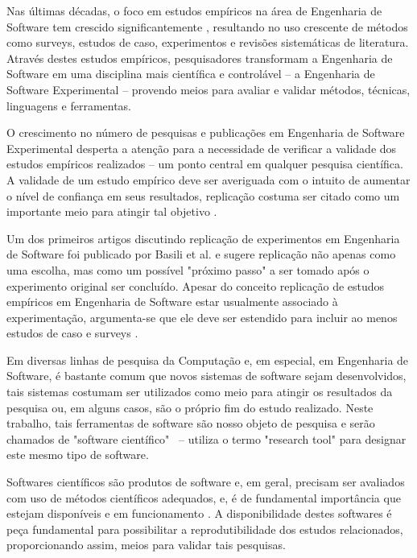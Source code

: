 \documentclass[12pt]{article}
\begin{document}
Nas últimas décadas, o foco em estudos empíricos na área de Engenharia de
Software tem crescido significantemente \cite{Stol2015}, resultando no uso
crescente de métodos como surveys, estudos de caso, experimentos e revisões
sistemáticas de literatura. Através destes estudos empíricos, pesquisadores
transformam a Engenharia de Software em uma disciplina mais científica e
controlável -- a  Engenharia de Software Experimental -- provendo meios para
avaliar e validar métodos, técnicas, linguagens e ferramentas.

O crescimento no número de pesquisas e publicações em Engenharia de Software
Experimental desperta a atenção para a necessidade de verificar a validade dos
estudos empíricos realizados -- um ponto central em qualquer pesquisa
científica. A validade de um estudo empírico deve ser averiguada com o intuito
de aumentar o nível de confiança em seus resultados, replicação costuma ser
citado como um importante meio para atingir tal objetivo \cite{Almqvist2006}.

Um dos primeiros artigos discutindo replicação de experimentos em Engenharia
de Software foi publicado por Basili et al. \cite{Mantyla2010} e sugere
replicação não apenas como uma escolha, mas como um possível "próximo passo" a
ser tomado após o experimento original ser concluído. Apesar do conceito
replicação de estudos empíricos em Engenharia de Software estar usualmente
associado à experimentação, argumenta-se que ele deve ser estendido para
incluir ao menos estudos de caso e surveys \cite{Basili1986}.

Em diversas linhas de pesquisa da Computação e, em especial, em Engenharia de
Software, é bastante comum que novos sistemas de software sejam desenvolvidos,
tais sistemas costumam ser utilizados como meio para atingir os resultados da
pesquisa ou, em alguns casos, são o próprio fim do estudo realizado. Neste
trabalho, tais ferramentas de software são nosso objeto de pesquisa e serão
chamados de "software científico" \ --  utiliza o
termo "research tool" para designar este mesmo tipo de software.

Softwares científicos são produtos de software e, em geral, precisam ser
avaliados com uso de métodos científicos adequados, e, é de fundamental
importância que estejam disponíveis e em funcionamento \cite{Kon2011}. A
disponibilidade destes softwares é peça fundamental para possibilitar a
reprodutibilidade dos estudos relacionados, proporcionando assim, meios para
validar tais pesquisas.
\end{document}
